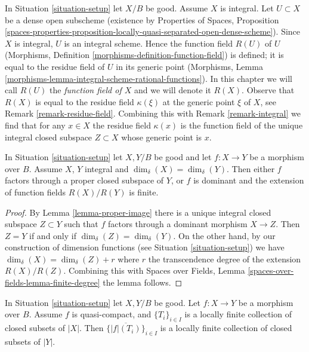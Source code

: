 \begin{remark}
\label{remark-function-field}
In Situation \ref{situation-setup} let $X/B$ be good. Assume $X$ is integral.
Let $U \subset X$ be a dense open subscheme (existence by
Properties of Spaces, Proposition
\ref{spaces-properties-proposition-locally-quasi-separated-open-dense-scheme}).
Since $X$ is integral, $U$ is an integral scheme.
Hence the function field $R(U)$ of $U$
(Morphisms, Definition \ref{morphisms-definition-function-field})
is defined; it is equal to the residue field of $U$ in its generic point
(Morphisms, Lemma \ref{morphisms-lemma-integral-scheme-rational-functions}).
In this chapter we will call $R(U)$ the {\it function field of $X$}
and we will denote it $R(X)$. Observe that $R(X)$ is equal to the
residue field $\kappa(\xi)$ at the generic point $\xi$ of $X$, see
Remark \ref{remark-residue-field}.
Combining this with Remark \ref{remark-integral}
we find that for any $x \in X$ the residue field
$\kappa(x)$ is the function field of the
unique integral closed subspace $Z \subset X$
whose generic point is $x$.
\end{remark}

\begin{lemma}
\label{lemma-equal-dimension}
In Situation \ref{situation-setup} let $X, Y/B$ be good and let
$f : X \to Y$ be a morphism over $B$.
Assume $X$, $Y$ integral and $\dim_\delta(X) = \dim_\delta(Y)$.
Then either $f$ factors through a proper closed subspace
of $Y$, or $f$ is dominant and the extension of function fields
$R(X) / R(Y)$ is finite.
\end{lemma}

\begin{proof}
By Lemma \ref{lemma-proper-image} there is a unique integral closed
subspace $Z \subset Y$ such that $f$ factors through a dominant
morphism $X \to Z$. Then $Z = Y$ if and only if
$\dim_\delta(Z) = \dim_\delta(Y)$. On the other hand, by
our construction of dimension functions (see Situation \ref{situation-setup})
we have $\dim_\delta(X) = \dim_\delta(Z) + r$ where $r$ the
transcendence degree of the extension $R(X)/R(Z)$. Combining this with
Spaces over Fields, Lemma \ref{spaces-over-fields-lemma-finite-degree}
the lemma follows.
\end{proof}

\begin{lemma}
\label{lemma-quasi-compact-locally-finite}
In Situation \ref{situation-setup} let $X, Y/B$ be good.
Let $f : X \to Y$ be a morphism over $B$.
Assume $f$ is quasi-compact, and $\{T_i\}_{i \in I}$ is a locally
finite collection of closed subsets of $|X|$.
Then $\{\overline{|f|(T_i)}\}_{i \in I}$ is a locally finite
collection of closed subsets of $|Y|$.
\end{lemma}

